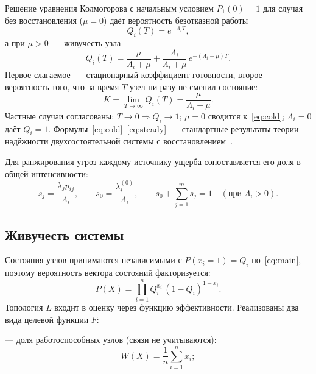\documentclass[12pt]{article}
\begin{document}
Решение уравнения Колмогорова с начальным условием $P_1(0) = 1$ для
случая без восстановления ($\mu = 0$) даёт вероятность безотказной работы
\begin{equation}
Q_i(T) = e^{-\Lambda_i T},
\label{eq:cold}
\end{equation}
а при $\mu > 0$~--- живучесть узла
\begin{equation}
Q_i(T) = \frac{\mu}{\Lambda_i + \mu}
+ \frac{\Lambda_i}{\Lambda_i + \mu}\, e^{-(\Lambda_i + \mu) T}.
\label{eq:main}
\end{equation}
Первое слагаемое~--- стационарный коэффициент готовности, второе~---
вероятность того, что за время $T$ узел ни разу не сменил состояние:
\begin{equation}
K = \lim_{T \to \infty} Q_i(T) = \frac{\mu}{\Lambda_i + \mu}.
\label{eq:steady}
\end{equation}
Частные случаи согласованы: $T \to 0 \Rightarrow Q_i \to 1$;
$\mu = 0$ сводится к~\eqref{eq:cold}; $\Lambda_i = 0$ даёт $Q_i = 1$.
Формулы~\eqref{eq:cold}--\eqref{eq:steady}~--- стандартные результаты
теории надёжности двухсостоятельной системы с
восстановлением~\cite{gnedenko,barlow,trivedi}.

Для ранжирования угроз каждому источнику ущерба сопоставляется его доля
в общей интенсивности:
\begin{equation}
s_j = \frac{\lambda_j p_{ij}}{\Lambda_i}, \qquad
s_0 = \frac{\lambda_i^{(0)}}{\Lambda_i}, \qquad
s_0 + \sum_{j=1}^{m} s_j = 1
\quad (\text{при } \Lambda_i > 0).
\label{eq:shares}
\end{equation}

\subsection{Живучесть системы}

Состояния узлов принимаются независимыми с $P(x_i = 1) = Q_i$
по~\eqref{eq:main}, поэтому вероятность вектора состояний факторизуется:
\begin{equation}
P(X) = \prod_{i=1}^{n} Q_i^{x_i}\, (1 - Q_i)^{1 - x_i}.
\label{eq:px}
\end{equation}
Топология $L$ входит в оценку через функцию эффективности. Реализованы
два вида целевой функции $F$:

--- доля работоспособных узлов (связи не учитываются):
\begin{equation}
W(X) = \frac{1}{n} \sum_{i=1}^{n} x_i;
\label{eq:wfraction}
\end{equation}
\end{document}
